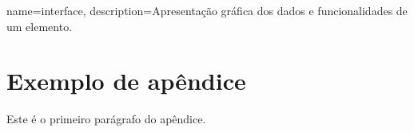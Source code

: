{
    name=interface,
    description={Apresentação gráfica dos dados e funcionalidades de um elemento.}
}

%
%
\chapter{Exemplo de apêndice} \label{ap:exemplo}
Este é o primeiro parágrafo do apêndice.


\lipsum[14-16]